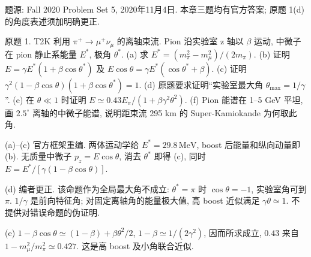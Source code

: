 题源: Fall 2020 Problem Set 5, 2020年11月4日. 本章三题均有官方答案; 原题 1(d) 的角度表述须加明确更正.
\begin{exercise}\label{ex:8701-5-1}
原题 1. T2K 利用 $\pi^+\to\mu^+\nu_\mu$ 的离轴束流. Pion 沿实验室 z 轴以 $\beta$ 运动, 中微子在 pion 静止系能量 $E^*$, 极角 $\theta^*$. (a) 求 $E^*=(m_\pi^2-m_\mu^2)/(2m_\pi)$. (b) 证明 $E=\gamma E^*(1+\beta\cos\theta^*)$ 及 $E\cos\theta=\gamma E^*(\cos\theta^*+\beta)$. (c) 证明 $\gamma^2(1-\beta\cos\theta)(1+\beta\cos\theta^*)=1$. (d) 原题要求证明``实验室最大角 $\theta_{\max}=1/\gamma$''. (e) 在 $\theta\ll1$ 时证明 $E\simeq0.43E_\pi/(1+\beta\gamma^2\theta^2)$. (f) Pion 能谱在 1--5 GeV 平坦, 画 $2.5^\circ$ 离轴的中微子能谱, 说明距束流 295 km 的 Super-Kamiokande 为何取此角.
\end{exercise}
\begin{solution}
(a)--(c) 官方框架重编. 两体运动学给 $E^*=29.8\,\mathrm{MeV}$, boost 后能量和纵向动量即 (b). 无质量中微子 $p_z=E\cos\theta$, 消去 $\theta^*$ 即得 (c), 同时 $E=E^*/[\gamma(1-\beta\cos\theta)]$.

(d) 编者更正. 该命题作为全局最大角不成立: $\theta^*=\pi$ 时 $\cos\theta=-1$, 实验室角可到 $\pi$. $1/\gamma$ 是前向特征角; 对固定离轴角的能量极大值, 高 boost 近似满足 $\gamma\theta\simeq1$. 不提供对错误命题的伪证明.

(e) $1-\beta\cos\theta\simeq(1-\beta)+\beta\theta^2/2$, $1-\beta\simeq1/(2\gamma^2)$, 因而所求成立, $0.43$ 来自 $1-m_\mu^2/m_\pi^2\simeq0.427$. 这是高 boost 及小角联合近似.


\end{solution}
